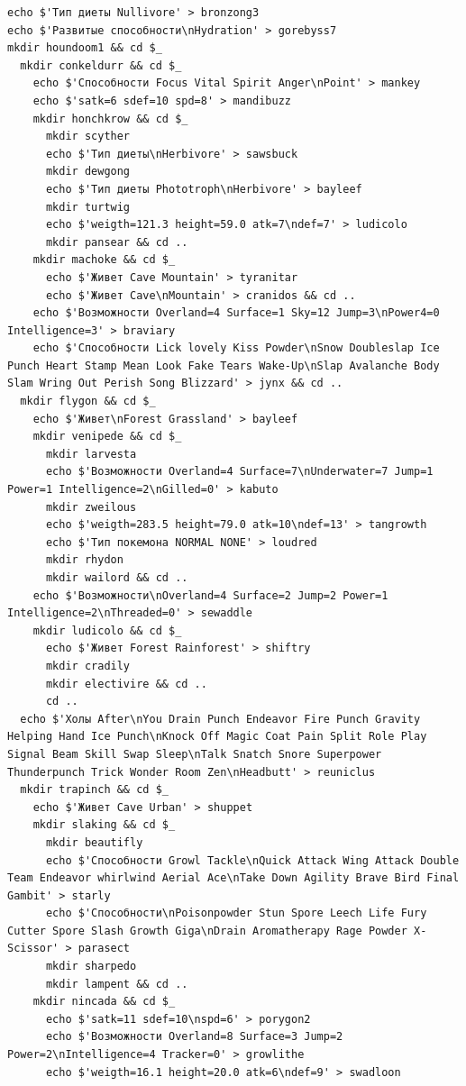 \documentclass{article}
\begin{document}
\begin{lstlisting}
echo $'Тип диеты Nullivore' > bronzong3
echo $'Развитые способности\nHydration' > gorebyss7
mkdir houndoom1 && cd $_
  mkdir conkeldurr && cd $_
    echo $'Способности Focus Vital Spirit Anger\nPoint' > mankey
    echo $'satk=6 sdef=10 spd=8' > mandibuzz
    mkdir honchkrow && cd $_
      mkdir scyther
      echo $'Тип диеты\nHerbivore' > sawsbuck
      mkdir dewgong
      echo $'Тип диеты Phototroph\nHerbivore' > bayleef
      mkdir turtwig
      echo $'weigth=121.3 height=59.0 atk=7\ndef=7' > ludicolo
      mkdir pansear && cd ..
    mkdir machoke && cd $_
      echo $'Живет Cave Mountain' > tyranitar
      echo $'Живет Cave\nMountain' > cranidos && cd ..
    echo $'Возможности Overland=4 Surface=1 Sky=12 Jump=3\nPower4=0 Intelligence=3' > braviary
    echo $'Способности Lick lovely Kiss Powder\nSnow Doubleslap Ice Punch Heart Stamp Mean Look Fake Tears Wake-Up\nSlap Avalanche Body Slam Wring Out Perish Song Blizzard' > jynx && cd ..
  mkdir flygon && cd $_
    echo $'Живет\nForest Grassland' > bayleef
    mkdir venipede && cd $_
      mkdir larvesta
      echo $'Возможности Overland=4 Surface=7\nUnderwater=7 Jump=1 Power=1 Intelligence=2\nGilled=0' > kabuto
      mkdir zweilous
      echo $'weigth=283.5 height=79.0 atk=10\ndef=13' > tangrowth
      echo $'Тип покемона NORMAL NONE' > loudred
      mkdir rhydon
      mkdir wailord && cd ..
    echo $'Возможности\nOverland=4 Surface=2 Jump=2 Power=1 Intelligence=2\nThreaded=0' > sewaddle 
    mkdir ludicolo && cd $_
      echo $'Живет Forest Rainforest' > shiftry
      mkdir cradily
      mkdir electivire && cd ..
      cd ..
  echo $'Холы After\nYou Drain Punch Endeavor Fire Punch Gravity Helping Hand Ice Punch\nKnock Off Magic Coat Pain Split Role Play Signal Beam Skill Swap Sleep\nTalk Snatch Snore Superpower Thunderpunch Trick Wonder Room Zen\nHeadbutt' > reuniclus
  mkdir trapinch && cd $_
    echo $'Живет Cave Urban' > shuppet
    mkdir slaking && cd $_
      mkdir beautifly
      echo $'Способности Growl Tackle\nQuick Attack Wing Attack Double Team Endeavor whirlwind Aerial Ace\nTake Down Agility Brave Bird Final Gambit' > starly
      echo $'Способности\nPoisonpowder Stun Spore Leech Life Fury Cutter Spore Slash Growth Giga\nDrain Aromatherapy Rage Powder X-Scissor' > parasect
      mkdir sharpedo
      mkdir lampent && cd ..
    mkdir nincada && cd $_
      echo $'satk=11 sdef=10\nspd=6' > porygon2
      echo $'Возможности Overland=8 Surface=3 Jump=2 Power=2\nIntelligence=4 Tracker=0' > growlithe
      echo $'weigth=16.1 height=20.0 atk=6\ndef=9' > swadloon

\end{lstlisting}
\end{document}
